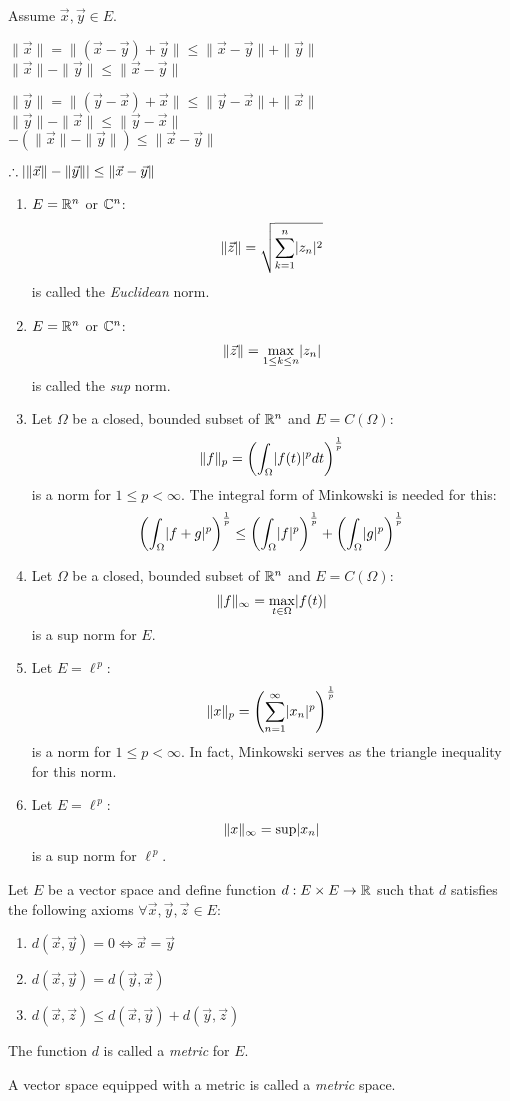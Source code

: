 \documentclass[letterpaper,12pt,fleqn]{article}
\renewcommand{\O}{\Omega}
\newcommand{\norm}[1]{\|#1\|}
\newcommand{\vx}{\vec{x}}
\newcommand{\vy}{\vec{y}}
\newcommand{\vz}{\vec{z}}
\newcommand{\lp}{\ell^{\,p}}
\begin{document}
\begin{theproof}
  Assume $\vx,\vy\in E$.

  $\norm{\vx}=\norm{(\vx-\vy)+\vy}\le\norm{\vx-\vy}+\norm{\vy}$ \\
  $\norm{\vx}-\norm{\vy}\le\norm{\vx-\vy}$

  $\norm{\vy}=\norm{(\vy-\vx)+\vx}\le\norm{\vy-\vx}+\norm{\vx}$ \\
  $\norm{\vy}-\norm{\vx}\le\norm{\vy-\vx}$ \\
  $-(\norm{\vx}-\norm{\vy})\le\norm{\vx-\vy}$

  $\therefore\abs{\norm{\vx}-\norm{\vy}}\le\norm{\vx-\vy}$
\end{theproof}

\begin{examples}
  \listbreak
  \begin{enumerate}
  \item $E=\mathbb{R}^n$ or $\mathbb{C}^n$:
    \[\norm{\vz}=\sqrt{\sum_{k=1}^n\abs{z_n}^2}\]
    is called the \emph{Euclidean} norm.

  \item $E=\mathbb{R}^n$ or $\mathbb{C}^n$:
    \[\norm{\vz}=\max_{1\le k\le n}\abs{z_n}\]
    is called the \emph{sup} norm.

  \item Let $\O$ be a closed, bounded subset of $\mathbb{R}^n$ and $E=C(\O)$:
    \[\norm{f}_p=\left(\int_{\O}\abs{f(t)}^pdt\right)^{\frac{1}{p}}\]
    is a norm for $1\le p<\infty$. The integral form of Minkowski is needed
    for this:
    \[\left(\int_{\O}\abs{f+g}^p\right)^{\frac{1}{p}}\le
    \left(\int_{\O}\abs{f}^p\right)^{\frac{1}{p}}+
    \left(\int_{\O}\abs{g}^p\right)^{\frac{1}{p}}\]

  \item Let $\O$ be a closed, bounded subset of $\mathbb{R}^n$ and $E=C(\O)$:
    \[\norm{f}_{\infty}=\max_{t\in\O}\abs{f(t)}\]
    is a sup norm for $E$.

  \item Let $E=\lp$:
    \[\norm{x}_p=\left(\sum_{n=1}^{\infty}\abs{x_n}^p\right)^{\frac{1}{p}}\]
    is a norm for $1\le p<\infty$. In fact, Minkowski serves as the triangle
    inequality for this norm.

  \item Let $E=\lp$:
    \[\norm{x}_{\infty}=\sup\abs{x_n}\]
    is a sup norm for $\lp$.
  \end{enumerate}
\end{examples}

\begin{definition}[Metric]
  Let $E$ be a vector space and define function $d:E\times E\to\mathbb{R}$ such that
  $d$ satisfies the following axioms $\forall\vx,\vy,\vz\in E$:
  \begin{enumerate}
  \item $d(\vx,\vy)=0\iff\vx=\vy$
  \item $d(\vx,\vy)=d(\vy,\vx)$
  \item $d(\vx,\vz)\le d(\vx,\vy)+d(\vy,\vz)$
  \end{enumerate}
  The function $d$ is called a \emph{metric} for $E$.

  A vector space equipped with a metric is called a \emph{metric} space.
\end{definition}
\end{document}
